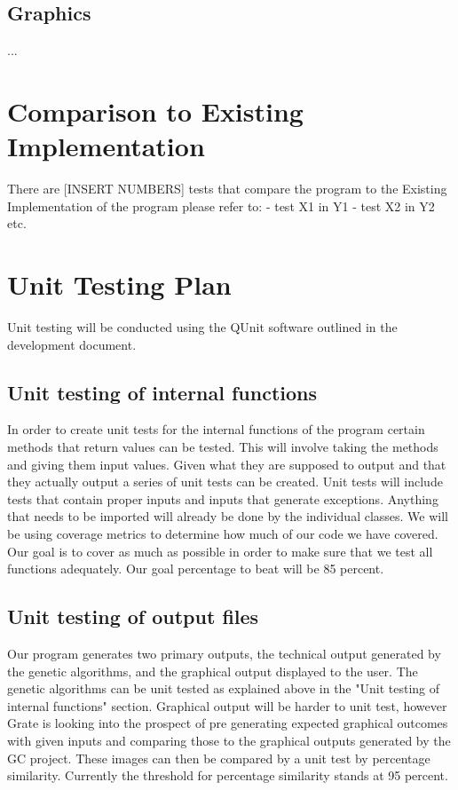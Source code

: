\documentclass[12pt, titlepage]{article}
\begin{document}
\subsection{Graphics}

...

	
\section{Comparison to Existing Implementation}	

There are [INSERT NUMBERS] tests that compare the program to the Existing Implementation of the program please refer to:
- test X1 in Y1
- test X2 in Y2
etc.
				
\section{Unit Testing Plan}

Unit testing will be conducted using the QUnit software outlined in the development document.
		
\subsection{Unit testing of internal functions}

In order to create unit tests for the internal functions of the program certain methods that return values
can be tested. This will involve taking the methods and giving them input values. Given what they are
supposed to output and that they actually output a series of unit tests can be created. Unit tests will include
tests that contain proper inputs and inputs that generate exceptions.  Anything that needs to be imported will already be done
by the individual classes. We will be using coverage metrics to determine how much of our code we have
covered. Our goal is to cover as much as possible in order to make sure that we test all functions adequately.
Our goal percentage to beat will be 85 percent.
		
\subsection{Unit testing of output files}		

Our program generates two primary outputs, the technical output generated by the genetic algorithms, and the graphical output displayed to the user. The genetic algorithms can be unit tested as explained above in the "Unit testing of internal functions" section. Graphical output will be harder to unit test, however Grate is looking into the prospect of pre generating expected graphical outcomes with given inputs and comparing those to the graphical outputs generated by the GC project. These images can then be compared by a unit test by percentage similarity. Currently the threshold for percentage similarity stands at 95 percent.
\end{document}
